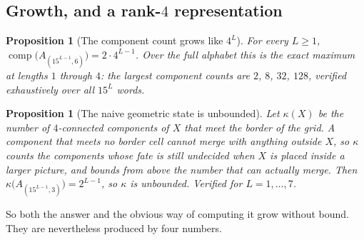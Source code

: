 \documentclass[11pt]{amsart}
\newtheorem{proposition}[theorem]{Proposition}
\theoremstyle{definition}
\theoremstyle{remark}
\begin{document}
\subsection{Growth, and a rank-\texorpdfstring{$4$}{4} representation}

\begin{proposition}[The component count grows like $4^L$]
\label{prop:peak}
For every $L \ge 1$, $\operatorname{comp}\bigl(A_{(15^{L-1}, 6)}\bigr) = 2 \cdot 4^{L-1}$. Over the full alphabet this is the exact maximum at lengths $1$ through $4$: the largest component counts are $2$, $8$, $32$, $128$, verified exhaustively over all $15^L$ words.
\end{proposition}

\begin{proposition}[The naive geometric state is unbounded]
\label{prop:kappa}
Let $\kappa(X)$ be the number of $4$-connected components of $X$ that meet the border of the grid. A component that meets no border cell cannot merge with anything outside $X$, so $\kappa$ counts the components whose fate is still undecided when $X$ is placed inside a larger picture, and bounds from above the number that can actually merge. Then $\kappa\bigl(A_{(15^{L-1},3)}\bigr) = 2^{L-1}$, so $\kappa$ is unbounded. Verified for $L = 1,\dots,7$.
\end{proposition}

So both the answer and the obvious way of computing it grow without bound. They are nevertheless produced by four numbers.
\end{document}

